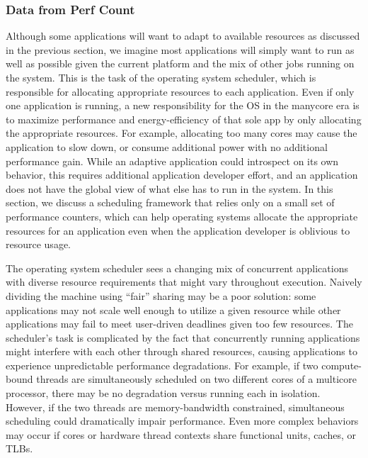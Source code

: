 \subsubsection*{Data from Perf Count}

Although some applications will want to adapt to available resources
as discussed in the previous section, we imagine most applications
will simply want to run as well as possible given the current platform
and the mix of other jobs running on the system.  This is the task of
the operating system scheduler, which is responsible for allocating
appropriate resources to each application.  Even if only one
application is running, a new responsibility for the OS in the
manycore era is to maximize performance and energy-efficiency of that
sole app by only allocating the appropriate resources.  For example,
allocating too many cores may cause the application to slow down, or
consume additional power with no additional performance gain.  While
an adaptive application could introspect on its own behavior, this
requires additional application developer effort, and an application
does not have the global view of what else has to run in the system.
In this section, we discuss a scheduling framework that relies only on a small set of performance counters,  which can help
operating systems allocate the appropriate resources for an
application even when the application developer is oblivious to
resource usage.


The operating system scheduler sees a changing mix of concurrent
applications with diverse resource requirements
that might vary throughout execution. Naively dividing the machine
using ``fair'' sharing may be a poor solution: some applications may not
scale well enough to utilize a given resource while other applications
may fail to meet user-driven deadlines given too few resources.  The
scheduler's task is complicated by the fact that concurrently running
applications might interfere with each other through shared resources,
causing applications to experience unpredictable performance
degradations.  For example, if two compute-bound threads are
simultaneously scheduled on two different cores of a multicore
processor, there may be no degradation versus running each in
isolation.  However, if the two threads are memory-bandwidth
constrained, simultaneous scheduling could dramatically impair
performance.  Even more complex behaviors may occur if cores or
hardware thread contexts share functional units, caches, or TLBs.

